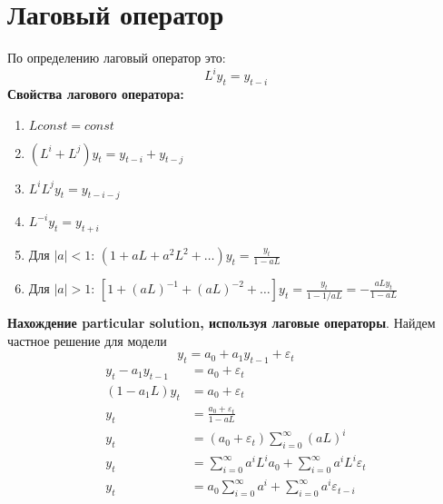 \documentclass[]{article}
\begin{document}
\section*{Лаговый оператор}
По определению лаговый оператор это:
\[	
	L^{i}y_t = y_{t-i}
\]
\textbf{Свойства лагового оператора:}
\begin{enumerate}
	\item $ Lconst = const $
	\item $ (L^{i} + L^{j})y_t = y_{t-i} + y_{t-j} $
	\item $ L^{i}L^{j}y_t = y_{t-i-j} $
	\item $ L^{-i}y_t = y_{t+i} $
	\item Для $ |a| <1 $: $ (1 + aL + a^2L^2 + \dots )y_t  = \frac{y_t}{1-aL}$
	\item Для $ |a| > 1 $: $ [1 + (aL)^{-1} + (aL)^{-2} + \dots]y_t = \frac{y_t}{1 - 1/aL} = -\frac{aLy_t}{1-aL} $
\end{enumerate}
\textbf{Нахождение particular solution, используя лаговые операторы}.
Найдем частное решение для модели
\[
	y_t = a_0 + a_1 y_{t-1} + \varepsilon_{t}
\]
\begin{align*}
y_t - a_1 y_{t-1} &= a_0 + \varepsilon_{t}\\
(1 -a_1L)y_t &= a_0+ \varepsilon_{t} \\
y_t &= \frac{a_0+ \varepsilon_{t}}{1-aL}\\
y_t&=(a_0 + \varepsilon_{t})\sum_{i=0}^{\infty}(aL)^{i} \\
y_t&= \sum_{i=0}^{\infty}a^iL^ia_0 + \sum_{i=0}^{\infty}a^iL^i\varepsilon_t \\
y_t &= a_0\sum_{i=0}^{\infty}a^i + \sum_{i=0}^{\infty}a^i\varepsilon_{t-i}
\end{align*}
\end{document}

